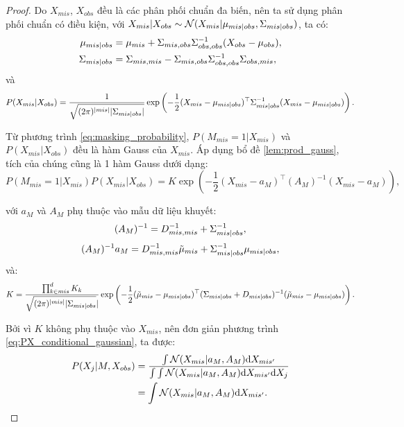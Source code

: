 \begin{proof}
    Do $X_{mis}$, $X_{obs}$ đều là các phân phối chuẩn đa biến, nên ta sử dụng phân phối chuẩn có điều kiện, với $X_{mis} | X_{obs} \sim \mathcal{N}(X_{mis} | \mu_{mis|obs}, \Sigma_{mis|obs})$, ta có:
    \begin{align}
        \mu_{mis|obs} &= \mu_{mis} + \Sigma_{mis, obs}\Sigma_{obs, obs}^{-1} (X_{obs} - \mu_{obs}) \label{eq:mu_mis_obs}, \\ 
        \Sigma_{mis|obs} &= \Sigma_{mis, mis} - \Sigma_{mis, obs} \Sigma_{obs, obs}^{-1} \Sigma_{obs, mis}, \notag
    \end{align}
    và
    \[
        P(X_{mis} | X_{obs}) = 
        \frac{1}{\sqrt{(2\pi)^{|mis|} |\Sigma_{mis|obs}|}}  \exp \left(- \frac{1}{2} (X_{mis} - \mu_{mis|obs})^{\top} \Sigma_{mis|obs}^{-1}  (X_{mis} - \mu_{mis|obs})\right).
    \]
    
    Từ phương trình \eqref{eq:masking_probability}, $P(M_{mis}=1 | X_{mis})$ và $P(X_{mis} | X_{obs})$ đều là hàm Gauss của $X_{mis}$. Áp dụng bổ đề \ref{lem:prod_gauss}, tích của chúng cũng là 1 hàm Gauss dưới dạng:
    \begin{equation*}
        P(M_{m i s}=1|X_{m i s})P(X_{m i s}|X_{o b s})=K\exp\left(-\frac{1}{2}(X_{m i s}-a_{M})^{\top}\left(A_{M}\right)^{-1}\left(X_{m i s}-a_{M}\right)\right),
    \end{equation*}

    với $a_M$ và $A_M$ phụ thuộc vào mẫu dữ liệu khuyết: 
    \begin{equation}\label{eq:A_M_inverse}
        (A_M)^{-1} = D_{mis,mis}^{-1} + \Sigma_{mis|obs}^{-1},
    \end{equation}
    \begin{equation}\label{eq:A_M_inverse_a_M}
        (A_M)^{-1}a_M = D_{mis,mis}^{-1}\tilde{\mu}_{mis} + \Sigma_{mis|obs}^{-1}\mu_{mis|obs},
    \end{equation}
    và:
    \begin{equation*}
        K = \frac{\prod_{k \in mis}^{d} K_{k}}{\sqrt{(2\pi)^{|mis|}|\Sigma_{mis|obs}}|}
        \exp\left(-\frac{1}{2} ({\tilde{\mu}}_{mis} - \mu_{mis|obs})^\top 
        (\Sigma_{mis|obs} + D_{mis|obs})^{-1}({\tilde{\mu}}_{mis} - \mu_{mis|obs})\right).
    \end{equation*}
    
    Bởi vì $K$ không phụ thuộc vào $X_{mis}$, nên đơn giản phương trình \eqref{eq:PX_conditional_gaussian}, ta được:
    \begin{align*}
        P(X_j|M, X_{obs}) &= \dfrac{\int \mathcal{N}(X_{mis} | a_M, A_M) \mathrm{d} X_{mis'}}{\int \int \mathcal{N}(X_{mis} | a_M, A_M) \mathrm{d} X_{mis'} \mathrm{d} X_j} \\
        &= \int \mathcal{N}(X_{mis} | a_M, A_M) \mathrm{d} X_{mis'}.
    \end{align*}
    

\end{proof}
